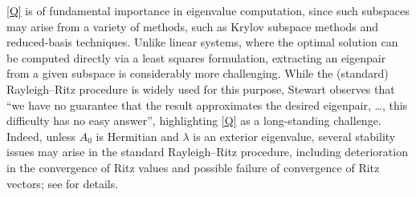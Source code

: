 \documentclass[a4paper,11pt]{article}
\begin{document}
\cref{Q} is of fundamental importance in eigenvalue computation, since such subspaces may arise from a variety of methods, such as Krylov subspace methods and reduced-basis techniques.
Unlike linear systems, where the optimal solution can be computed directly via a least squares formulation, extracting an eigenpair from a given subspace is considerably more challenging.
While the (standard) Rayleigh--Ritz procedure \cite[Chap.~4.4]{Stewart2001} is widely used for this purpose, Stewart \cite[p.~282]{Stewart2001} observes that ``we have no guarantee that the result approximates the desired eigenpair, \ldots, this difficulty has no easy answer'', highlighting \cref{Q} as a long-standing challenge.
Indeed, unless $A_{0}$ is Hermitian and $\lambda$ is an exterior eigenvalue, several stability issues may arise in the standard Rayleigh--Ritz procedure, including deterioration in the convergence of Ritz values and possible failure of convergence of Ritz vectors; see  for details.
\end{document}
